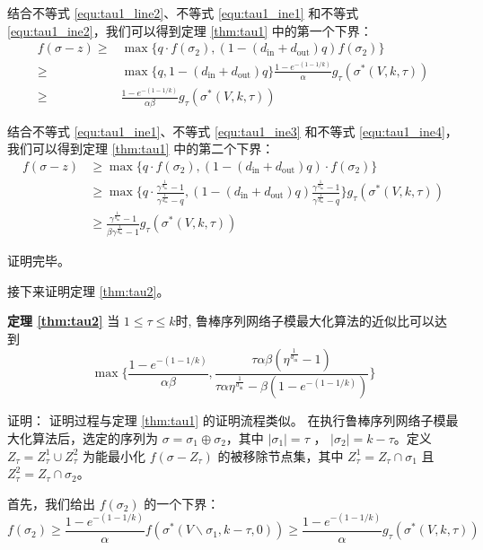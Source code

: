 结合不等式 \ref{equ:tau1_line2}、不等式 \ref{equ:tau1_ine1} 和不等式 \ref{equ:tau1_ine2}，我们可以得到定理 \ref{thm:tau1} 中的第一个下界：
\begin{align}
    f(\sigma -z ) \ge & \max\{ q \cdot f(\sigma_2),(1-(d_{\text{in}} + d_{\text{out}})q) f(\sigma_2)\} \\
    \ge & \max\{q,1-(d_{\text{in}} + d_{\text{out}})q\} \frac{1-e^{-(1-1/k)}}{\alpha} g_\tau(\sigma^*(V,k,\tau)) \\
    \ge & \frac{1-e^{-(1-1/k)}}{\alpha\beta} g_\tau(\sigma^*(V,k,\tau))
\end{align}

结合不等式 \ref{equ:tau1_ine1}、不等式 \ref{equ:tau1_ine3} 和不等式 \ref{equ:tau1_ine4}，我们可以得到定理 \ref{thm:tau1} 中的第二个下界：
\begin{align}
     f(\sigma -z ) & \ge \max\{ q \cdot f(\sigma_2),(1-(d_{\text{in}} + d_{\text{out}})q) \cdot f(\sigma_2)\} \\
    & \ge \max\{ q \cdot \frac{\gamma^{\frac{1}{d_{\text{in}}}}-1}{\gamma^{\frac{1}{d_{\text{in}}}}-q} , (1-(d_{\text{in}} + d_{\text{out}})q) \frac{\gamma^{\frac{1}{d_{\text{in}}}}-1}{\gamma^{\frac{1}{d_{\text{in}}}}-q} \} g_\tau(\sigma^*(V,k,\tau)) \\
    & \ge \frac{\gamma^{\frac{1}{d_{\text{in}}}}-1}{\beta \gamma^{\frac{1}{d_{\text{in}}}}-1} g_\tau(\sigma^*(V,k,\tau))
\end{align}

\noindent 证明完毕。


接下来证明定理 \ref{thm:tau2}。

\noindent \textbf{定理 \ref{thm:tau2}} 当 $1\le \tau \le k$时, 鲁棒序列网络子模最大化算法的近似比可以达到
\begin{equation*}
 \max\{\frac{1-e^{-(1-1/k)}}{\alpha\beta},\frac{\tau\alpha\beta(\eta^{\frac{1}{d_{\text{in}}}}-1)}{\tau\alpha\eta^{\frac{1}{d_{\text{in}}}}- \beta (1-e^{-(1-1/k)}) }\}   
\end{equation*}

\noindent 证明：
证明过程与定理 \ref{thm:tau1} 的证明流程类似。
在执行鲁棒序列网络子模最大化算法后，选定的序列为 $\sigma=\sigma_1 \oplus \sigma_2$，其中 $|\sigma_1|=\tau$ ， $|\sigma_2|=k-\tau$。定义 $Z_{\tau} = Z_{\tau}^1 \cup Z_{\tau}^2$ 为能最小化 $f(\sigma-Z_{\tau})$ 的被移除节点集，其中 $Z_{\tau}^1 = Z_{\tau} \cap \sigma_1$ 且 $Z_{\tau}^2 = Z_{\tau} \cap \sigma_2$。

首先，我们给出 $f(\sigma_2)$ 的一个下界：
\begin{equation}
    f(\sigma_2) \ge \frac{1-e^{-(1-1/k)}}{\alpha} f(\sigma^*(V\backslash \sigma_1,k-\tau,0)) \ge \frac{1-e^{-(1-1/k)}}{\alpha} g_\tau(\sigma^*(V,k,\tau)) \label{equ:tau2_line1}
\end{equation}

